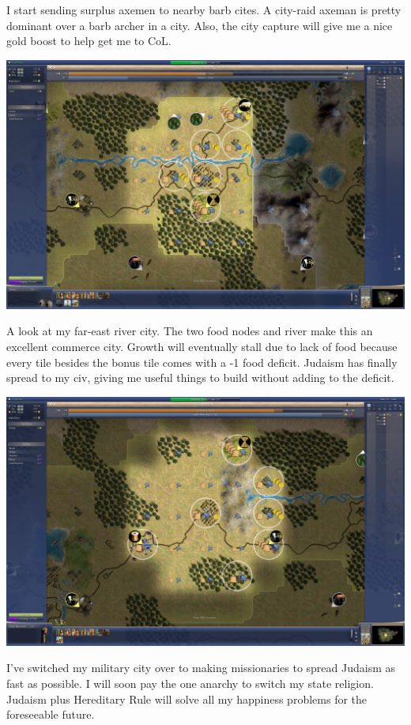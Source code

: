 \documentclass[10pt]{article}
\begin{document}
I start sending surplus axemen to nearby barb cites. A city-raid axeman is pretty dominant over a barb archer in
a city. Also, the city capture will give me a nice gold boost to help get me to CoL.

\includegraphics[width=1.0\textwidth]{88}

A look at my far-east river city. The two food nodes and river make this an excellent commerce city. Growth will
eventually stall due to lack of food because every tile besides the bonus tile comes with a -1 food deficit.
Judaism has finally spread to my civ, giving me useful things to build without adding to the deficit.

\includegraphics[width=1.0\textwidth]{89}

I've switched my military city over to making missionaries to spread Judaism as fast as possible. I will soon
pay the one anarchy to switch my state religion. Judaism plus Hereditary Rule will solve all my happiness problems
for the foreseeable future.
\end{document}
